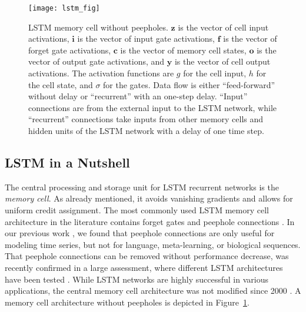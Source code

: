 \documentclass{article}
\newcommand\Bc{\bm{c}}
\newcommand\Bf{\bm{f}}
\newcommand\Bi{\bm{i}}
\newcommand\Bo{\bm{o}}
\newcommand\By{\bm{y}}
\newcommand\Bz{\bm{z}}
\begin{document}
\begin{appendices}
\begin{figure}[htb]
\centering
\texttt{[image: lstm\_fig]}
\caption{LSTM memory cell without peepholes. 
$\Bz$ is the vector of cell input
activations, $\Bi$ is the vector of input gate
activations,  $\Bf$ is the vector of forget gate
activations,  $\Bc$ is the vector of memory cell states,
$\Bo$ is the vector of output gate
activations, and $\By$ is the vector of cell output 
activations. The activation functions are $g$ for the cell input, $h$ for the cell
state, and $\sigma$ for the gates. Data flow is either ``feed-forward''
without delay or ``recurrent'' with an one-step delay.
``Input'' connections are from the
external input to the LSTM network, while ``recurrent'' connections take inputs
from other memory cells and hidden units of the LSTM network with a delay of one time step.  
\label{fig:cellFB}}
\end{figure}

\subsection{LSTM in a Nutshell}

The central processing and storage unit for LSTM recurrent networks is
the {\em memory cell}. As already mentioned, it avoids vanishing gradients and allows for
uniform credit assignment.
The most commonly used LSTM memory cell architecture in the 
literature \cite{Graves:05,Schmidhuber:15} 
contains forget gates \cite{Gers:99a,Gers:00}
and peephole connections \cite{Gers:00a}. 
In our previous work \cite{Hochreiter:01,Hochreiter:07}, 
we found that peephole connections are 
only useful for modeling time series, but not for 
language, meta-learning, or biological sequences. 
That peephole connections can be removed without performance decrease, 
was recently confirmed in a large assessment, where 
different LSTM architectures have been tested \cite{Greff:15}.
While LSTM networks are highly successful in various applications, 
the central memory cell architecture was not modified since 2000 \cite{Schmidhuber:15}.
A memory cell architecture without peepholes is depicted in
Figure~\ref{fig:cellFB}. 


\end{appendices}
\end{document}
